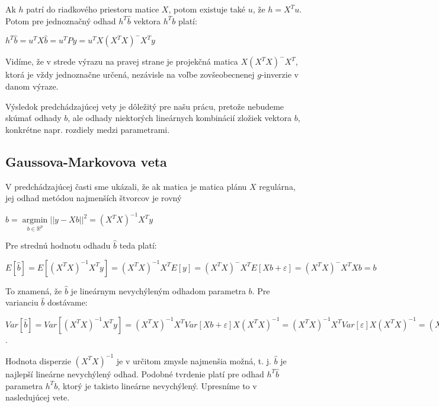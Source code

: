 Ak $h$ patrí do riadkového priestoru matice $X$, potom existuje také $u$, že $h = X^T u$.
Potom pre jednoznačný odhad $h^T \hat{b}$ vektora $h^T b$ platí:

\begin{center}
$h^T \hat{b} = u^T X \hat{b} = u^T P y = u^T X(X^T X)^- X^T y$
\end{center}

Vidíme, že v strede výrazu na pravej strane je projekčná matica $X(X^T X)^- X^T$, ktorá je vždy jednoznačne určená, 
nezávisle na voľbe zovšeobecnenej $g$-inverzie v danom výraze.

Výsledok predchádzajúcej vety je dôležitý pre našu prácu, pretože nebudeme skúmať odhady $b$,
ale odhady niektorých lineárnych kombinácií zložiek vektora $b$, 
konkrétne napr. rozdiely medzi parametrami.

\subsection{Gaussova-Markovova veta}

V predchádzajúcej časti sme ukázali, že ak matica je matica plánu $X$ regulárna,
jej odhad metódou najmenších štvorcov je rovný

\begin{center}
$
\hat{b} = \underset{b \in \mathbb{R}^{p}}{\operatorname{arg min}} ||y - Xb||^2 = (X^T X)^{-1} X^T y
$
\end{center}

Pre strednú hodnotu odhadu $\hat{b}$ teda platí:

\begin{center}
$
E[\hat{b}] = E[(X^T X)^{-1} X^T y] = (X^T X)^{-1} X^T E[y] = (X^T X)^- X^T E[Xb + \varepsilon] = (X^T X)^- X^T X b = b
$
\end{center}

To znamená, že $\hat{b}$ je lineárnym nevychýleným odhadom parametra $b$.
Pre varianciu $\hat{b}$ dostávame:

\begin{center}
$
Var[\hat{b}] = Var[(X^T X)^{-1} X^T y] = (X^T X)^{-1} X^T Var[Xb + \varepsilon] X (X^T X)^{-1} =
(X^T X)^{-1} X^T Var[\varepsilon] X (X^T X)^{-1} = (X^T X)^{-1} X^T I X (X^T X)^{-1} = (X^T X)^{-1}
$.
\end{center}

Hodnota disperzie $(X^T X)^{-1}$ je v určitom zmysle najmenšia možná, t. j. $\hat{b}$ je najlepší lineárne nevychýlený odhad.
Podobné tvrdenie platí pre odhad $h^T \hat{b}$ parametra $h^T b$, ktorý je takisto lineárne nevychýlený. Upresníme to v nasledujúcej vete.

